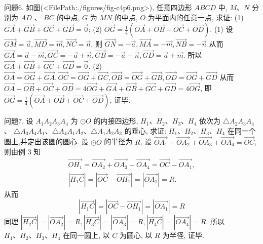 问题6. 如图(<FilePath:./figures/fig-c4p6.png>), 任意四边形 $A B C D$ 中, $M 、 N$ 分别为 $A D$ 、 $B C$ 的中点, $G$ 为 $M N$ 的中点, $O$ 为平面内的任意一点, 求证:
(1) $\overrightarrow{G A}+\overrightarrow{G B}+\overrightarrow{G C}+\overrightarrow{G D}=\overrightarrow{0}$;
(2) $\overrightarrow{O G}=\frac{1}{4}(\overrightarrow{O A}+\overrightarrow{O B}+\overrightarrow{O C}+\overrightarrow{O D})$.
(1) 设 $\overrightarrow{G M}=\vec{a}, \overrightarrow{M D}=\vec{m}, \overrightarrow{N C}=\vec{n}$, 则 $\overrightarrow{G N}=-\vec{a}, \overrightarrow{M A}=-\vec{m}, \overrightarrow{N B}= -\vec{n}$
从而 $\overrightarrow{G A}=\vec{a}-\vec{m}, \overrightarrow{G C}=-\vec{a}+\vec{n}, \overrightarrow{G B}=-\vec{a}-\vec{n}, \overrightarrow{G D}=\vec{a}+\vec{m}$.
所以 $\overrightarrow{G A}+\overrightarrow{G B}+\overrightarrow{G C}+\overrightarrow{G D}=\overrightarrow{0}$.
(2) $\overrightarrow{O A}=\overrightarrow{O G}+\overrightarrow{G A}, \overrightarrow{O C}=\overrightarrow{O G}+\overrightarrow{G C}, \overrightarrow{O B}=\overrightarrow{O G}+\overrightarrow{G B}, \overrightarrow{O D}=\overrightarrow{O G}+ \overrightarrow{G D}$
从而 $\overrightarrow{O A}+\overrightarrow{O B}+\overrightarrow{O C}+\overrightarrow{O D}=4 \overrightarrow{O G}+\overrightarrow{G A}+\overrightarrow{G B}+\overrightarrow{G C}+\overrightarrow{G D}=4 \overrightarrow{O G}$, 即 $\overrightarrow{O G}=\frac{1}{4}(\overrightarrow{O A}+\overrightarrow{O B}+\overrightarrow{O C}+\overrightarrow{O D})$, 证毕.



问题7. 设 $A_1 A_2 A_3 A_4$ 为 $\odot O$ 的内接四边形, $H_1 、 H_2 、 H_3 、 H_4$ 依次为 $\triangle A_2 A_3 A_4$ 、 $\triangle A_3 A_4 A_1 、 \triangle A_4 A_1 A_2 、 \triangle A_1 A_2 A_3$ 的垂心, 求证: $H_1 、 H_2 、 H_3 、 H_4$ 在同一个圆上,并定出该圆的圆心.
设 $\odot O$ 的半径为 $R$, 设 $\overrightarrow{O A_1}+\overrightarrow{O A_2}+\overrightarrow{O A_3}+\overrightarrow{O A_4}=\overrightarrow{O C}$, 则由例 3 知
$$
\begin{gathered}
\overrightarrow{O H_1}=\overrightarrow{O A_2}+\overrightarrow{O A_3}+\overrightarrow{O A_4}=\overrightarrow{O C}-\overrightarrow{O A_1}, \\
\left|\overrightarrow{H_1 C}\right|=\left|\overrightarrow{O C}-\overrightarrow{O H_1}\right|=\left|\overrightarrow{O A_1}\right|=R .
\end{gathered}
$$
从而
$$
\left|\overrightarrow{H_1 C}\right|=\left|\overrightarrow{O C}-\overrightarrow{O H_1}\right|=\left|\overrightarrow{O A_1}\right|=R
$$
同理 $\left|\overrightarrow{H_2 C}\right|=\left|\overrightarrow{O A_2}\right|=R,\left|\overrightarrow{H_3 C}\right|=\left|\overrightarrow{O A_3}\right|=R,\left|\overrightarrow{H_4 C}\right|=\left|\overrightarrow{O A_4}\right|=R$. 所以 $H_1 、 H_2 、 H_3 、 H_4$ 在同一圆上, 以 $C$ 为圆心, 以 $R$ 为半径, 证毕.


